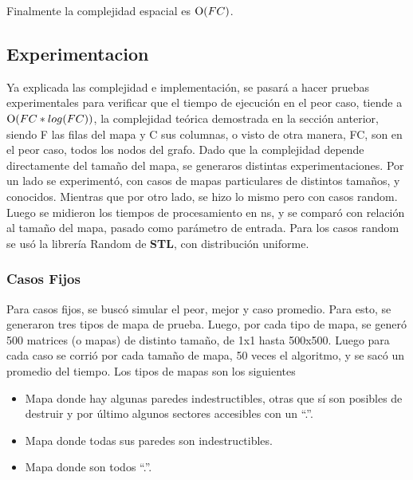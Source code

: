 	Finalmente la complejidad espacial es $\operatorname{O}(FC)$.


    \subsection{Experimentacion}
         

    Ya explicada las complejidad e implementación, se pasará a hacer pruebas experimentales para verificar que el tiempo de ejecución en el peor caso, tiende a $\operatorname{O}(FC*log(FC))$, la complejidad teórica demostrada en la sección anterior, siendo F las filas del mapa y C sus columnas, o visto de otra manera, FC, son en el peor caso, todos los nodos del grafo. Dado que la complejidad depende directamente del tamaño del mapa, se generaros distintas experimentaciones. Por un lado se experimentó, con casos de mapas particulares de distintos tamaños, y conocidos. Mientras que por otro lado, se hizo lo mismo pero con casos random. Luego se midieron los tiempos de procesamiento en ns, y se comparó con relación al tamaño del mapa, pasado como parámetro de entrada. Para los casos random se usó la librería Random de \textbf{STL}, con distribución uniforme. \par

    \subsubsection{Casos Fijos}

    Para casos fijos, se buscó simular el peor, mejor y caso promedio. Para esto, se generaron tres tipos de mapa de prueba. Luego, por cada tipo de mapa, se generó 500 matrices (o mapas) de distinto tamaño, de 1x1 hasta 500x500. Luego para cada caso se corrió por cada tamaño de mapa, 50 veces el algoritmo, y se sacó un promedio del tiempo. Los tipos de mapas son los siguientes

    \begin{itemize}
    	\item Mapa donde hay algunas paredes indestructibles, otras que sí son posibles de destruir y por último algunos sectores accesibles con un “.”.
    	\item Mapa donde todas sus paredes son indestructibles.
    	\item Mapa donde son todos “.”.
    \end{itemize}


